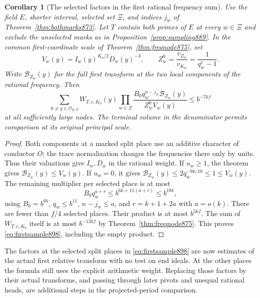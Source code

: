 \documentclass[a4paper,11pt]{article}
\newtheorem{corollary}[proposition]{Corollary}
\theoremstyle{definition}
\theoremstyle{remark}
\numberwithin{equation}{section}
\begin{document}
\begin{corollary}[The selected factors in the first rational frequency sum]
\leavevmode\label{cor:firstsample898}
Use the field \(E\), shorter interval, selected set \(\Xi\),
and indices \(j_w\) of Theorem~\ref{thm:bothmarks873}.
Let \(T\) contain both primes of \(E\) at every \(w\in\Xi\)
and exclude the unselected marks as in
Proposition~\ref{prop:sampling889}. In the common first-coordinate
scale of Theorem~\ref{thm:freqnode875}, set
\[
 V_w(y)=I_w(y)^{K_0/2}D_w(y)^{-3},\qquad
 Z_w^0=\frac{v_{Z_w}}{v_{K_w}}=\frac{1}{q_w^r-1}.
\]
Write \(\mathcal B_{Z_w}(y)\) for the full first transform at the
two local components of the rational frequency. Then
\begin{equation}
 \sum_{0\ne y\in\mathcal O_{E,T}}
       W_{T,c,K_0}(y)
       \prod_{w\in\Xi}
         \frac{B_0q_w^{n-j_w}\mathcal B_{Z_w}(y)}
                        {Z_w^0 V_w(y)}
             \le b^{-7kf}
 \label{eq:firstsample898}
\end{equation}
at all sufficiently large nodes. The terminal volume in the
denominator permits comparison at its original principal scale.
\end{corollary}
\begin{proof}
Both components at a marked split place use an additive
character of conductor \(O\); the trace normalization changes
the frequencies there only by units. Thus their valuations give
\(I_w,D_w\) in the rational weight. If \(u_w\ge1\), the theorem
gives \(\mathcal B_{Z_w}(y)\le V_w(y)\). If \(u_w=0\), it gives
\(\mathcal B_{Z_w}(y)\le2q_w^{-9k/10}\le1\le V_w(y)\).
The remaining multiplier per selected place is at most
\[
        B_0 q_w^{a+r}\le b^{6k+11(a+r)}\le b^{18k},
\]
using \(B_0=b^{6k}\), \(q_w\le b^{11}\), \(n-j_w\le a\), and
\(r=k+1+2a\) with \(a=o(k)\).
There are fewer than \(f/4\) selected places. Their product
is at most \(b^{5kf}\). The sum of \(W_{T,c,K_0}\) itself
is at most \(b^{-12kf}\) by Theorem~\ref{thm:freqnode875}.
This proves \eqref{eq:firstsample898}, including the empty
product.
\end{proof}

The factors at the selected split places in \eqref{eq:firstsample898}
are now estimates of the actual first relative transform with no
test on end ideals. At the other places the formula still uses
the explicit arithmetic weight. Replacing those factors by their
actual transforms, and passing through later pivots and unequal
rational heads, are additional steps in the projected-period
comparison.
\clearpage
\end{document}
